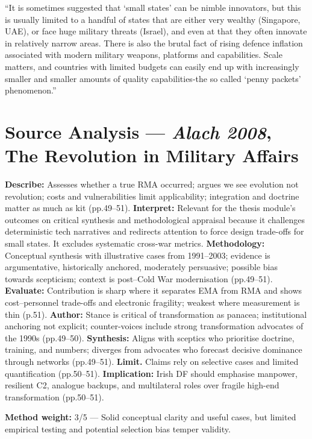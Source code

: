 \parencite{FLYNN_2019} ``It is sometimes suggested that ‘small 
states’ can be nimble innovators, but this is usually limited to a handful of states that are 
either very wealthy (Singapore, UAE), or face huge military threats (Israel), and even at that 
they often innovate in relatively narrow areas. There is also the brutal fact of rising defence 
inflation associated with modern military weapons, platforms and capabilities. Scale matters, 
and countries with limited budgets can easily end up with increasingly smaller and smaller 
amounts of quality capabilities-the so called ‘penny packets’ phenomenon.''

\section*{Source Analysis — \textit{Alach 2008}, The Revolution in Military Affairs}
\textbf{Describe:} Assesses whether a true RMA occurred; argues we see evolution not revolution; costs and vulnerabilities limit applicability; integration and doctrine matter as much as kit (pp.49–51).
\textbf{Interpret:} Relevant for the thesis module’s outcomes on critical synthesis and methodological appraisal because it challenges deterministic tech narratives and redirects attention to force design trade-offs for small states. It excludes systematic cross-war metrics.
\textbf{Methodology:} Conceptual synthesis with illustrative cases from 1991–2003; evidence is argumentative, historically anchored, moderately persuasive; possible bias towards scepticism; context is post–Cold War modernisation (pp.49–51).
\textbf{Evaluate:} Contribution is sharp where it separates EMA from RMA and shows cost–personnel trade-offs and electronic fragility; weakest where measurement is thin (p.51).
\textbf{Author:} Stance is critical of transformation as panacea; institutional anchoring not explicit; counter-voices include strong transformation advocates of the 1990s (pp.49–50).
\textbf{Synthesis:} Aligns with sceptics who prioritise doctrine, training, and numbers; diverges from advocates who forecast decisive dominance through networks (pp.49–51).
\textbf{Limit.} Claims rely on selective cases and limited quantification (pp.50–51).
\textbf{Implication:} Irish DF should emphasise manpower, resilient C2, analogue backups, and multilateral roles over fragile high-end transformation (pp.50–51).

\textbf{Method weight:} 3/5 — Solid conceptual clarity and useful cases, but limited empirical testing and potential selection bias temper validity.

